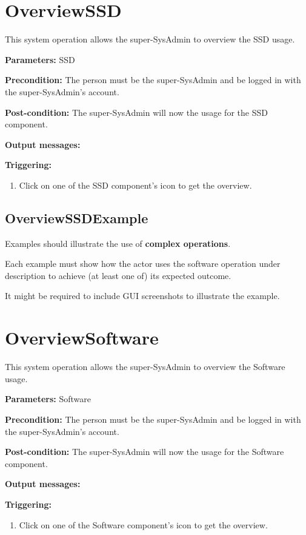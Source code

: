 \section{OverviewSSD}
\label{operation:overviewssd}
This system operation allows the super-SysAdmin to overview the SSD usage.

\begin{description}

\item \textbf{Parameters:} SSD
\item \textbf{Precondition:} The person must be the super-SysAdmin and be logged
in with the super-SysAdmin's account.
\item \textbf{Post-condition:} The super-SysAdmin will now the usage for the SSD
component.
\item \textbf{Output messages:}

\item \textbf{Triggering:}
\begin{enumerate}
\item Click on one of the SSD component's icon to get the overview. 
\end{enumerate}

 
\end{description}
 
\subsection{OverviewSSDExample}
Examples should illustrate the use of \textbf{complex operations}.

Each example must show how the actor uses the software operation under
description to achieve (at least one of) its expected outcome.

It might be required to include GUI screenshots to illustrate the example.
 
 
 
 
 
\section{OverviewSoftware}
\label{operation:overviewsoftware}
This system operation allows the super-SysAdmin to overview the Software usage.

\begin{description}

\item \textbf{Parameters:} Software
\item \textbf{Precondition:} The person must be the super-SysAdmin and be logged
in with the super-SysAdmin's account.
\item \textbf{Post-condition:} The super-SysAdmin will now the usage for the
Software component.
\item \textbf{Output messages:}

\item \textbf{Triggering:}
\begin{enumerate}
\item Click on one of the Software component's icon to get the overview. 
\end{enumerate}

 
\end{description}


